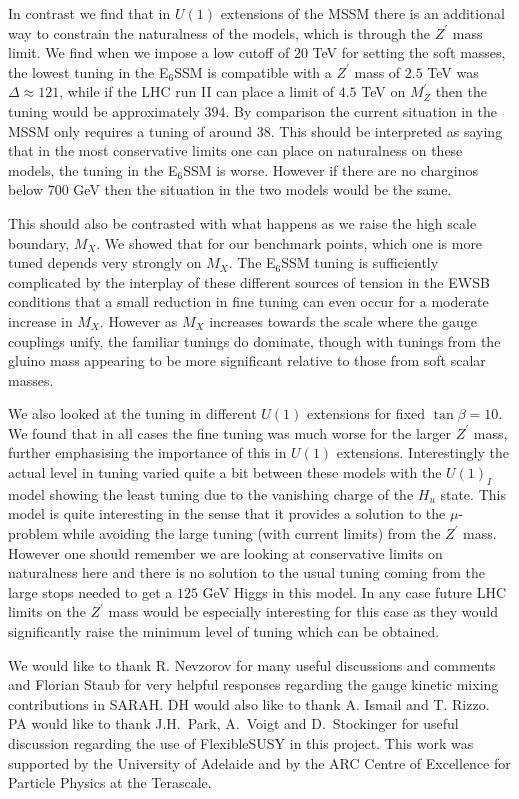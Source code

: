 \documentclass[preprint,amsmath,amssymb,aps,superscriptaddress,prd,showpacs,floatfix,nofootinbib]{revtex4-1}
\begin{document}
In contrast we find that in $U(1)$ extensions of the MSSM there is an
additional way to constrain the naturalness of the models, which is
through the $Z^\prime$ mass limit.  We find when we impose a low
cutoff of $20$ TeV for setting the soft masses, the lowest tuning in
the E$_6$SSM is compatible with a $Z^\prime$ mass of $2.5$ TeV was
$\Delta \approx 121$, while if the LHC run II can place a limit of
$4.5$ TeV on $M_Z^\prime$ then the tuning would be approximately $394$.
By comparison the current situation in the MSSM only requires a tuning
of around $38$. This should be interpreted as saying that in
the most conservative limits one can place on naturalness on these
models, the tuning in the E$_6$SSM is worse.  However if there are no
charginos below $700$ GeV then the situation in the two models would
be the same.

This should also be contrasted with what happens as we raise the high
scale boundary, $M_X$.  We showed that for our benchmark points, which
one is more tuned depends very strongly on $M_X$.  The E$_6$SSM tuning
is sufficiently complicated by the interplay of these different
sources of tension in the EWSB conditions that a small reduction in
fine tuning can even occur for a moderate increase in $M_X$.  However
as $M_X$ increases towards the scale where the gauge couplings unify,
the familiar tunings do dominate, though with tunings from the gluino
mass appearing to be more significant relative to those from soft
scalar masses.  


We also looked at the tuning in different $U(1)$ extensions for
fixed $\tan \beta = 10$.  We found that in all cases the fine tuning
was much worse for the larger $Z^\prime$ mass, further emphasising
the importance of this in $U(1)$ extensions.  Interestingly
the actual level in tuning varied quite a bit between these models
with the $U(1)_I$ model showing the least tuning due to the vanishing
charge of the $H_u$ state. This model is quite interesting in the
sense that it provides a solution to the $\mu$-problem while avoiding
the large tuning (with current limits) from the $Z^\prime$
mass. However one should remember we are looking at conservative limits
on naturalness here and there is no solution to the usual tuning coming from
the large stops needed to get a $125$ GeV Higgs in this model.  In any
case future LHC limits on the $Z^\prime$ mass would be especially
interesting for this case as they would significantly raise the
minimum level of tuning which can be obtained.

\acknowledgements We would like to thank R. Nevzorov for many useful
discussions and comments and Florian Staub for very helpful responses
regarding the gauge kinetic mixing contributions in SARAH. DH would
also like to thank A. Ismail and T. Rizzo. PA would like to thank
J.H.~Park, A.~Voigt and D.~Stockinger for useful discussion regarding
the use of FlexibleSUSY in this project. This work was supported by
the University of Adelaide and by the ARC Centre of Excellence for
Particle Physics at the Terascale.
\end{document}
